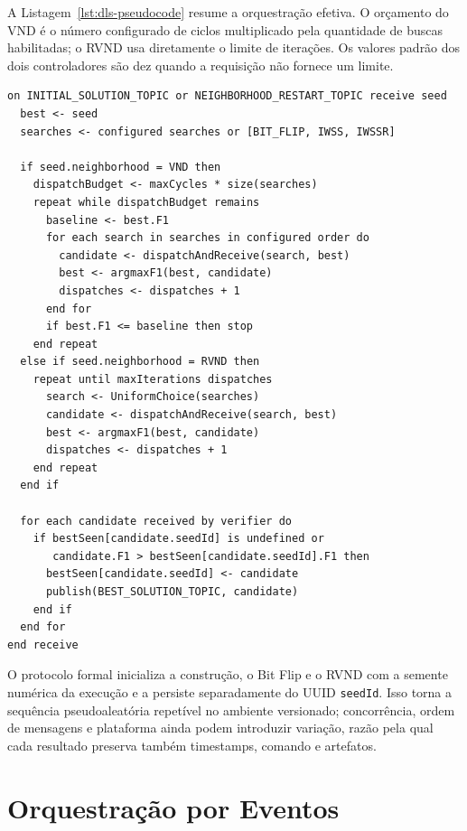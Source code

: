A Listagem~\ref{lst:dls-pseudocode} resume a orquestração efetiva. O orçamento do VND é o número configurado de ciclos multiplicado pela quantidade de buscas habilitadas; o RVND usa diretamente o limite de iterações. Os valores padrão dos dois controladores são dez quando a requisição não fornece um limite.

\begin{lstlisting}[caption={Refinamento e verificação distribuídos implementados no DLS.},label={lst:dls-pseudocode},basicstyle=\ttfamily\small,breaklines=true,columns=fullflexible]
on INITIAL_SOLUTION_TOPIC or NEIGHBORHOOD_RESTART_TOPIC receive seed
  best <- seed
  searches <- configured searches or [BIT_FLIP, IWSS, IWSSR]

  if seed.neighborhood = VND then
    dispatchBudget <- maxCycles * size(searches)
    repeat while dispatchBudget remains
      baseline <- best.F1
      for each search in searches in configured order do
        candidate <- dispatchAndReceive(search, best)
        best <- argmaxF1(best, candidate)
        dispatches <- dispatches + 1
      end for
      if best.F1 <= baseline then stop
    end repeat
  else if seed.neighborhood = RVND then
    repeat until maxIterations dispatches
      search <- UniformChoice(searches)
      candidate <- dispatchAndReceive(search, best)
      best <- argmaxF1(best, candidate)
      dispatches <- dispatches + 1
    end repeat
  end if

  for each candidate received by verifier do
    if bestSeen[candidate.seedId] is undefined or
       candidate.F1 > bestSeen[candidate.seedId].F1 then
      bestSeen[candidate.seedId] <- candidate
      publish(BEST_SOLUTION_TOPIC, candidate)
    end if
  end for
end receive
\end{lstlisting}

O protocolo formal inicializa a construção, o Bit Flip e o RVND com a semente numérica da execução e a persiste separadamente do UUID \texttt{seedId}. Isso torna a sequência pseudoaleatória repetível no ambiente versionado; concorrência, ordem de mensagens e plataforma ainda podem introduzir variação, razão pela qual cada resultado preserva também timestamps, comando e artefatos.

\section{Orquestração por Eventos}

